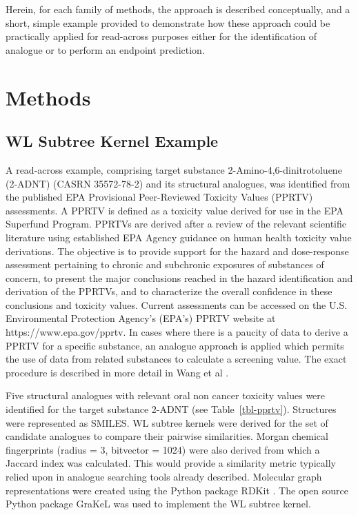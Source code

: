 \documentclass[
  super,
  preprint,
  3p]{elsarticle}
\begin{document}
Herein, for each family of methods, the approach is described
conceptually, and a short, simple example provided to demonstrate how
these approach could be practically applied for read-across purposes
either for the identification of analogue or to perform an endpoint
prediction.

\section{Methods}\label{methods}

\subsection{WL Subtree Kernel Example}\label{sec-wl}

A read-across example, comprising target substance
2-Amino-4,6-dinitrotoluene (2-ADNT) (CASRN 35572-78-2) and its
structural analogues, was identified from the published EPA Provisional
Peer-Reviewed Toxicity Values (PPRTV) assessments. A PPRTV is defined as
a toxicity value derived for use in the EPA Superfund Program. PPRTVs
are derived after a review of the relevant scientific literature using
established EPA Agency guidance on human health toxicity value
derivations. The objective is to provide support for the hazard and
dose-response assessment pertaining to chronic and subchronic exposures
of substances of concern, to present the major conclusions reached in
the hazard identification and derivation of the PPRTVs, and to
characterize the overall confidence in these conclusions and toxicity
values. Current assessments can be accessed on the U.S. Environmental
Protection Agency's (EPA's) PPRTV website at https://www.epa.gov/pprtv.
In cases where there is a paucity of data to derive a PPRTV for a
specific substance, an analogue approach is applied which permits the
use of data from related substances to calculate a screening value. The
exact procedure is described in more detail in Wang et al
\citep{wang_application_2012}.

Five structural analogues with relevant oral non cancer toxicity values
were identified for the target substance 2-ADNT (see
Table~\ref{tbl-pprtv}). Structures were represented as SMILES. WL
subtree kernels were derived for the set of candidate analogues to
compare their pairwise similarities. Morgan chemical fingerprints
(radius = 3, bitvector = 1024) were also derived from which a Jaccard
index was calculated. This would provide a similarity metric typically
relied upon in analogue searching tools already described. Molecular
graph representations were created using the Python package RDKit
\citep{landrum_rdkit}. The open source Python package GraKeL
\citep{siglidis_grakel_2020} was used to implement the WL subtree
kernel.
\end{document}
